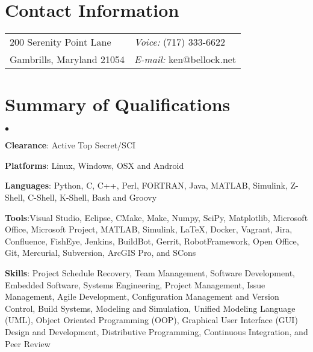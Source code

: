 \documentclass[margin,line]{res}
\newenvironment{list2}{%
  \begin{list}{$\bullet$}{%
      \setlength{\itemsep}{0in}
      \setlength{\parsep}{0in} \setlength{\parskip}{0in}
      \setlength{\topsep}{0in} \setlength{\partopsep}{0in} 
  \setlength{\leftmargin}{0.2in}}}{\end{list}}
\begin{document}

\begin{resume}

\section{\sc Contact Information}\vspace{.05in}
\begin{tabular}{@{}p{4in}p{4in}}
200 Serenity Point Lane   & \emph{Voice:}  (717) 333-6622 \\            
Gambrills, Maryland 21054 & \emph{E-mail:}  ken@bellock.net\\         
\end{tabular}

\section{\sc Summary of Qualifications} 
\begin{list2}
\item \textbf{Clearance}: Active Top Secret/SCI
\item \textbf{Platforms}: Linux, Windows, OSX and Android
\item \textbf{Languages}: Python, C, C++, Perl, FORTRAN, Java, MATLAB, Simulink, Z-Shell, C-Shell, K-Shell, Bash and Groovy
\item \textbf{Tools}:Visual Studio, Eclipse, CMake, Make, Numpy, SciPy, Matplotlib, Microsoft Office, Microsoft Project,  MATLAB, Simulink, \LaTeX, Docker, Vagrant, Jira, Confluence, FishEye, Jenkins, BuildBot, Gerrit, RobotFramework, Open Office, Git, Mercurial, Subversion, ArcGIS Pro, and  SCons
\item \textbf{Skills}: Project Schedule Recovery, Team Management, Software Development, Embedded Software, Systems Engineering, Project Management, Issue Management, Agile Development, Configuration Management and Version Control, Build Systems, Modeling and Simulation, Unified Modeling Language (UML), Object Oriented Programming (OOP), Graphical User Interface (GUI) Design and Development, Distributive Programming, Continuous Integration,  and Peer Review
\end{list2}


\end{resume}
\end{document}

